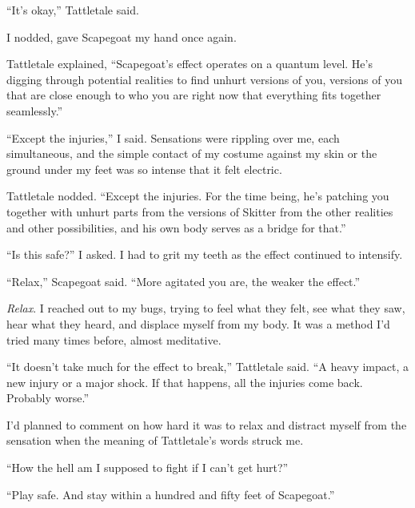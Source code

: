 ``It's okay,'' Tattletale said.



I nodded, gave Scapegoat my hand once again.



Tattletale explained, ``Scapegoat's effect operates on a quantum level.  He's digging through potential realities to find unhurt versions of you, versions of you that are close enough to who you are right now that everything fits together seamlessly.''



``Except the injuries,'' I said.  Sensations were rippling over me, each simultaneous, and the simple contact of my costume against my skin or the ground under my feet was so intense that it felt electric.



Tattletale nodded.  ``Except the injuries.  For the time being, he's patching you together with unhurt parts from the versions of Skitter from the other realities and other possibilities, and his own body serves as a bridge for that.''



``Is this safe?'' I asked.  I had to grit my teeth as the effect continued to intensify.



``Relax,'' Scapegoat said.  ``More agitated you are, the weaker the effect.''



\emph{Relax}.  I reached out to my bugs, trying to feel what they felt, see what they saw, hear what they heard, and displace myself from my body.  It was a method I'd tried many times before, almost meditative.



``It doesn't take much for the effect to break,'' Tattletale said.  ``A heavy impact, a new injury or a major shock.  If that happens, all the injuries come back.  Probably worse.''



I'd planned to comment on how hard it was to relax and distract myself from the sensation when the meaning of Tattletale's words struck me.



``How the hell am I supposed to fight if I can't get hurt?''



``Play safe.  And stay within a hundred and fifty feet of Scapegoat.''



